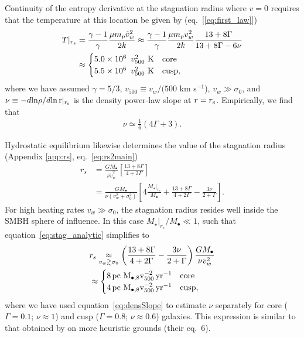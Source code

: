 \documentclass[usenatbib,fleqn]{mn2e}
\newcommand{\rs}{r_s}
\newcommand{\vw}{\tilde{v}_{w}}
\newcommand{\pc}{\rm pc}
\newcommand{\Mstar}{M_{\star}}
\newcommand{\Mbh}[1][]{M_{\bullet#1}}
\newcommand{\Mbheight}{M_{\bullet,8}}
\newcommand{\pyear}{{\rm yr}^{-1}}
\newcommand{\densSlope}{\nu}
\begin{document}
Continuity of the entropy derivative at the stagnation radius where $v = 0$ requires that the temperature at this location be given by (eq.~[\ref{eq:first_law}])
\begin{align}
T|_{r_{s}}& = \frac{\gamma-1}{\gamma}\frac{\mu m_p
  \tilde{v}_{w}^{2}}{2k} \approx \frac{\gamma-1}{\gamma}\frac{\mu
  m_p v_w^2}{2k} \frac{13+8\Gamma}{13+8\Gamma-6\nu} \nonumber\\ 
 &\approx
 \begin{cases}
  5.0\times 10^6\ \, v_{500}^2 \,\,{\rm K} & \text{core} \\
  5.5\times 10^6\ \, v_{500}^2 \,\,{\rm K} & \text{cusp},
 \end{cases}
\label{eq:Tanalytic}
\end{align}
where we have assumed $\gamma=5/3$, $v_{500} \equiv v_{w}/(500$ km
s$^{-1}$), $v_w\gg\sigma_0$,  and $\densSlope \equiv -d{\rm ln}\rho/d{\rm ln\,r}|_{r_{\rm
    s}}$ is the density power-law slope at $r = r_{\rm s}$.
Empirically, we find that
\begin{align}
\densSlope \simeq \frac{1}{6} \left(4 \Gamma+3\right).
\label{eq:densSlope}
\end{align}

Hydrostatic equilibrium likewise determines the value of the stagnation radius (Appendix \ref{app:rs}, eq.~\ref{eq:rs2main})
\begin{align}
  \rs&=\frac{G \Mbh}{\densSlope \vw^2}\left[\frac{13+ 8\Gamma}{4+2\Gamma}\right]\nonumber\\
  &=\frac{G \Mbh}{\densSlope (v_w^{2}+\sigma_0^2)}\left[4
    \frac{\Mstar|_{\rs}}{\Mbh} +\frac{13+
      8\Gamma}{4+2\Gamma}- \frac{3\nu}{2+\Gamma}\right]. 
\label{eq:stag_analytic}
\end{align}
For high heating rates $v_w \gg \sigma_0$, the stagnation radius resides well inside the SMBH sphere of influence.  In this case $\Mstar|_{\rs}/\Mbh \ll1$, such that equation~\eqref{eq:stag_analytic} simplifies to
\begin{align}
  &\rs \underset{v_w \gtrsim \sigma_0}\approx
  \left(\frac{13+8\Gamma}{4+2\Gamma}-
    \frac{3\nu}{2+\Gamma}\right)\frac{G \Mbh}{\nu v_w^2}\nonumber\\
  &\approx \begin{cases} 8
    \, \pc \,\, \Mbheight v_{500}^{-2}\, \pyear& \text{core} \\
    4 \, \pc \,\, \Mbheight v_{500}^{-2} \, \pyear & \text{cusp},
  \end{cases}
  \label{eq:stag_simple}
\end{align}
where we have used equation~\eqref{eq:densSlope} to estimate
$\densSlope$ separately for
core ($\Gamma = 0.1$; $\densSlope\approx 1$) and cusp ($\Gamma = 0.8$; $\densSlope \approx 0.6$) galaxies.  This
expression is similar to that obtained by \citet{Volonteri+11} on more
heuristic grounds (their eq.~6). 
\end{document}
